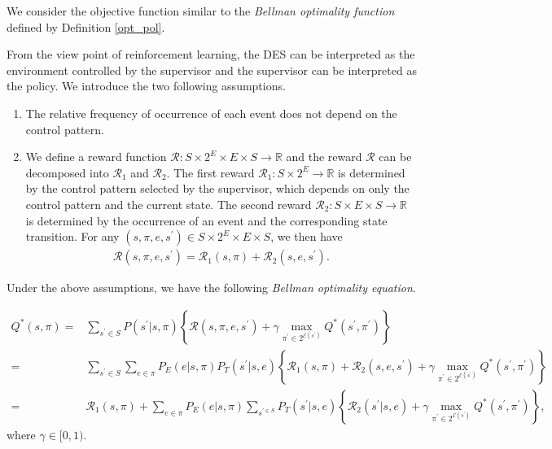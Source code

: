 We consider the objective function similar to the {\it Bellman optimality function} defined by Definition \ref{opt_pol}.
\begin{definition}

  From the view point of reinforcement learning, the DES can be interpreted as the environment controlled by the supervisor and the supervisor can be interpreted as the policy. We introduce the two following assumptions.

  \begin{enumerate}
    \item The relative frequency of occurrence of each event does not depend on the control pattern.
    \item We define a reward function $\mathcal{R} : S \times 2^E \times E \times S \rightarrow \mathbb{R}$ and the reward $\mathcal{R}$ can be decomposed into $\mathcal{R}_1$ and $\mathcal{R}_2$. The first reward $\mathcal{R}_1 : S \times 2^E \rightarrow \mathbb{R}$ is determined by the control pattern selected by the supervisor, which depends on only the control pattern and the current state. The second reward $\mathcal{R}_2 : S \times E \times S \rightarrow \mathbb{R}$ is determined by the occurrence of an event and the corresponding state transition. For any $(s,\pi,e,s^{\prime}) \in S \times 2^E \times E \times S$, we then have
    \begin{align}
      \mathcal{R}(s,\pi,e,s^{\prime}) = \mathcal{R}_1(s,\pi) + \mathcal{R}_2(s,e,s^{\prime}).
    \end{align}
  \end{enumerate}
  Under the above assumptions, we have the following {\it Bellman optimality equation}.

  \begin{align}
    Q^{\ast}(s,\pi) = & \sum_{s^{\prime} \in S} P(s^{\prime}|s,\pi)\left \{ \mathcal{R}(s,\pi,e,s^{\prime}) + \gamma \max_{\pi^{\prime} \in 2^{\mathcal{E}(s^{\prime})}} Q^{\ast}(s^{\prime},\pi^{\prime}) \right \} \nonumber \\
    = & \sum_{s^{\prime} \in S} \sum_{e \in \pi} P_E(e|s,\pi) P_T(s^{\prime}|s,e) \left \{ \mathcal{R}_1(s,\pi) + \mathcal{R}_2(s,e,s^{\prime}) + \gamma \max_{\pi^{\prime} \in 2^{\mathcal{E}(s^{\prime})}} Q^{\ast}(s^{\prime},\pi^{\prime}) \right \} \nonumber \\
    = & \mathcal{R}_1(s,\pi) + \sum_{e \in \pi} P_E(e|s,\pi) \sum_{s^{\prime \in S}} P_T(s^{\prime}|s,e) \left \{ \mathcal{R}_2(s^{\prime}|s,e) + \gamma \max_{\pi^{\prime} \in 2^{\mathcal{E}(s^{\prime})}} Q^{\ast}(s^{\prime}, \pi^{\prime}) \right \},
  \end{align}
  where $\gamma \in [0,1)$.


\end{definition}
